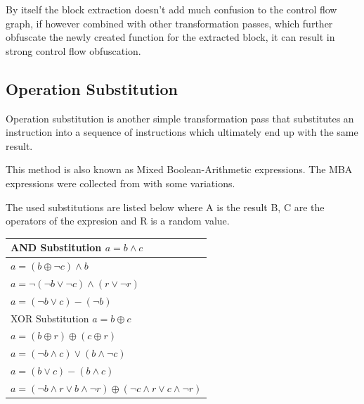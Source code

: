 By itself the block extraction doesn't add much confusion to the control flow graph, if however combined with
other transformation passes, which further obfuscate the newly created function for the extracted block, it can result
in strong control flow obfuscation.

\subsection{Operation Substitution}

Operation substitution is another simple transformation pass that substitutes an instruction into a sequence
of instructions which ultimately end up with the same result.

This method is also known as Mixed Boolean-Arithmetic expressions. The MBA expressions were collected from \cite{ollvm, mba-exp} with
some variations.

The used substitutions are listed below where A is the result B, C are the operators of the expresion and R is
a random value.

\begin{center}
\begin{tabular}{|l|}
  \hline
  AND Substitution $a = b \land c$ \\
  \hline
  $a = (b \oplus \neg c) \land b$ \\
  $a = \neg(\neg b \lor \neg c) \land (r \lor \neg r)$ \\
  $a = (\neg b \lor c) - (\neg b)$ \\
  \hline
  XOR Substitution $a = b \oplus c$ \\
  \hline
  $a = (b \oplus r) \oplus (c \oplus r)$\\
  $a = (\neg b \land c) \lor (b \land \neg c)$\\
  $a = (b \lor c) - (b \land c)$\\
  $a = (\neg b \land r \lor b \land \neg r) \oplus (\neg c \land r \lor c \land \neg r)$\\
  \hline
\end{tabular}
\end{center}

